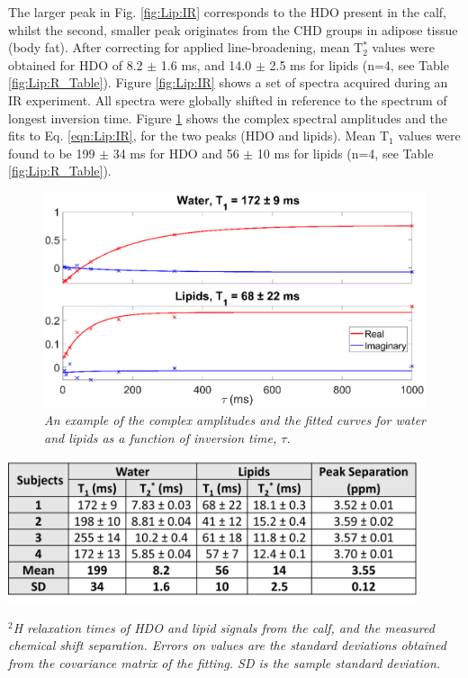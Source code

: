 The larger peak in Fig. \ref{fig:Lip:IR} corresponds to the HDO present in the calf, whilst the second, smaller peak originates from the CHD groups in adipose tissue (body fat). After correcting for applied line-broadening, mean T$_2^*$ values were obtained for \ac{HDO} of 8.2 $\pm$ 1.6 ms, and 14.0 $\pm$ 2.5 ms for lipids (n=4, see Table \ref{fig:Lip:R_Table}). Figure \ref{fig:Lip:IR} shows a set of spectra acquired during an \ac{IR} experiment. All spectra were globally shifted in reference to the spectrum of longest inversion time. Figure \ref{fig:Lip:Amp_Tau} shows the complex spectral amplitudes and the fits to Eq. \ref{eqn:Lip:IR}, for the two peaks (\ac{HDO} and lipids). Mean T$_1$ values were found to be 199 $\pm$ 34 ms for \ac{HDO} and 56 $\pm$ 10 ms for lipids (n=4, see Table \ref{fig:Lip:R_Table}).

\begin{figure}
    \centering
    \includegraphics[width=1\textwidth]{Figures/Lipid/Amp_Tau.png}
    \caption{\textit{An example of the complex amplitudes and the fitted curves for water and lipids as a function of inversion time, $\tau$.}}
    \label{fig:Lip:Amp_Tau}
\end{figure}

\begin{table}
    \centering
    \includegraphics[width=0.9\textwidth]{Figures/Lipid/Relaxation_Table.png}
    \caption{\textit{$^2$H relaxation times of \ac{HDO} and lipid signals from the calf, and the measured chemical shift separation. Errors on values are the standard deviations obtained from the covariance matrix of the fitting. SD is the sample standard deviation.}}
    \label{fig:Lip:R_Table}
\end{table}

